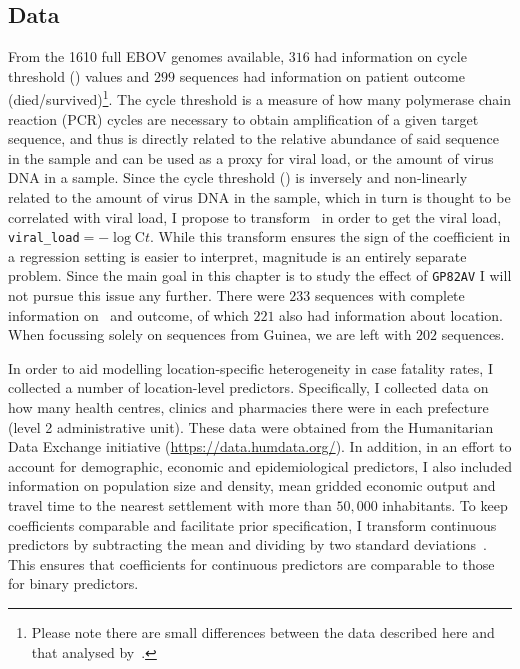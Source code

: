\subsection{Data}

From the 1610 full EBOV genomes available, $316$ had information on cycle threshold (\ct) values and $299$ sequences had information on patient outcome (died/survived)\footnote{Please note there are small differences between the data described here and that analysed by~\cite{Diehl2016}.}.
The cycle threshold is a measure of how many polymerase chain reaction (PCR) cycles are necessary to obtain amplification of a given target sequence, and thus is directly related to the relative abundance of said sequence in the sample and can be used as a proxy for viral load, or the amount of virus DNA in a sample.
Since the cycle threshold (\ct) is inversely and non-linearly related to the amount of virus DNA in the sample, which in turn is thought to be correlated with viral load, I propose to transform \ct~in order to get the viral load, \verb|viral_load|$= -\log \text{C}t$.
While this transform ensures the sign of the coefficient in a regression setting is easier to interpret, magnitude is an entirely separate problem.
Since the main goal in this chapter is to study the effect of \verb|GP82AV| I will not pursue this issue any further.
There were $233$ sequences with complete information on \ct~and outcome, of which $221$ also had information about location.
When focussing solely on sequences from Guinea, we are left with $202$ sequences.

In order to aid modelling location-specific heterogeneity in case fatality rates, I collected a number of location-level predictors.
Specifically, I collected data on how many health centres, clinics and pharmacies there were in each prefecture (level 2 administrative unit).
These data were obtained from the Humanitarian Data Exchange initiative (\url{https://data.humdata.org/}).
In addition, in an effort to account for demographic, economic and epidemiological predictors, I also included information on population size and density, mean gridded economic output and travel time to the nearest settlement with more than $50,000$ inhabitants.
To keep coefficients comparable and facilitate prior specification, I transform continuous predictors by subtracting the mean and dividing by two standard deviations~\citep{Gelman2008}.
This ensures that coefficients for continuous predictors are comparable to those for binary predictors.

